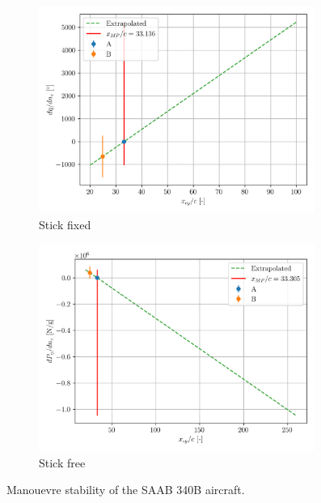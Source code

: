 \documentclass{article}
\begin{document}
\begin{figure}[H]
    \centering
    \begin{subfigure}{0.45\textwidth}
        \centering
        \includegraphics[width=0.99\textwidth]{../exercise1/Manoeuvre_Stability_2.png}
        \caption{Stick fixed}
    \end{subfigure}
    \begin{subfigure}{0.45\textwidth}
        \centering
        \includegraphics[width=0.99\textwidth]{../exercise1/Manoeuvre_Stability_4.png}
        \caption{Stick free}
    \end{subfigure}
    \caption{Manouevre stability of the SAAB 340B aircraft.}
    \label{fig:Manouevre_stability}
\end{figure}
\end{document}
